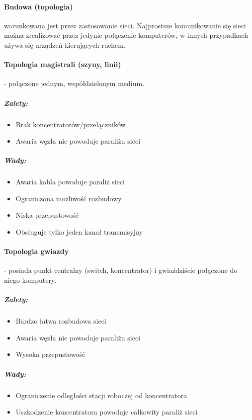 \documentclass[]{report}
\begin{document}
\paragraph{Budowa (topologia)} warunkowana jest przez zastosowanie sieci. Najprostsze komunikowanie się sieci można zrealizować przez jedynie połączenie komputerów, w innych przypadkach używa się urządzeń kierujących ruchem.

\paragraph{Topologia magistrali (szyny, linii)} - połączone jednym, współdzielonym medium.
\subparagraph{Zalety:}
\begin{itemize}
\item Brak koncentratorów/przełączników
\item Awaria węzła nie powoduje paraliżu sieci
\end{itemize}
\subparagraph{Wady:}
\begin{itemize}
\item Awaria kabla powoduje paraliż sieci
\item Ograniczona możliwość rozbudowy
\item Niska przepustowość
\item Obsługuje tylko jeden kanał transmisyjny
\end{itemize}

\paragraph{Topologia gwiazdy} - posiada punkt centralny (switch, koncentrator) i gwiaździście połączone do niego komputery.
\subparagraph{Zalety:}
\begin{itemize}
\item Bardzo łatwa rozbudowa sieci
\item Awaria węzła nie powoduje paraliżu sieci
\item Wysoka przepustowość
\end{itemize}
\subparagraph{Wady:}
\begin{itemize}
\item Ograniczenie odległości stacji roboczej od koncentratora
\item Uszkodzenie koncentratora powoduje całkowity paraliż sieci
\end{itemize}
\end{document}
